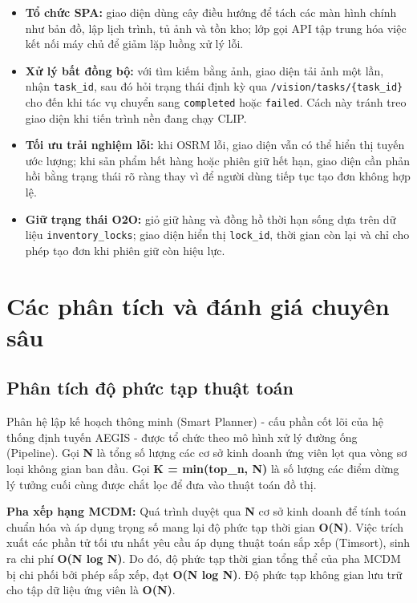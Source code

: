 \documentclass[12pt, a4paper]{article}
\begin{document}
\begin{itemize}
    \item \textbf{Tổ chức SPA:} giao diện dùng cây điều hướng để tách các màn hình chính như bản đồ, lập lịch trình, tủ ảnh và tồn kho; lớp gọi API tập trung hóa việc kết nối máy chủ để giảm lặp luồng xử lý lỗi.
    
    \item \textbf{Xử lý bất đồng bộ:} với tìm kiếm bằng ảnh, giao diện tải ảnh một lần, nhận \texttt{task\_id}, sau đó hỏi trạng thái định kỳ qua \texttt{/vision/tasks/\{task\_id\}} cho đến khi tác vụ chuyển sang \texttt{completed} hoặc \texttt{failed}. Cách này tránh treo giao diện khi tiến trình nền đang chạy CLIP.
    
    \item \textbf{Tối ưu trải nghiệm lỗi:} khi OSRM lỗi, giao diện vẫn có thể hiển thị tuyến ước lượng; khi sản phẩm hết hàng hoặc phiên giữ hết hạn, giao diện cần phản hồi bằng trạng thái rõ ràng thay vì để người dùng tiếp tục tạo đơn không hợp lệ.

    \item \textbf{Giữ trạng thái O2O:} giỏ giữ hàng và đồng hồ thời hạn sống dựa trên dữ liệu \texttt{inventory\_locks}; giao diện hiển thị \texttt{lock\_id}, thời gian còn lại và chỉ cho phép tạo đơn khi phiên giữ còn hiệu lực.
\end{itemize}

\clearpage
\section{Các phân tích và đánh giá chuyên sâu}

\subsection{Phân tích độ phức tạp thuật toán}
Phân hệ lập kế hoạch thông minh (Smart Planner) - cấu phần cốt lõi của hệ thống định tuyến AEGIS - được tổ chức theo mô hình xử lý đường ống (Pipeline). Gọi \textbf{N} là tổng số lượng các cơ sở kinh doanh ứng viên lọt qua vòng sơ loại không gian ban đầu. Gọi \textbf{K = min(top\_n, N)} là số lượng các điểm dừng lý tưởng cuối cùng được chắt lọc để đưa vào thuật toán đồ thị.

\textbf{Pha xếp hạng MCDM:} 
Quá trình duyệt qua \textbf{N} cơ sở kinh doanh để tính toán chuẩn hóa và áp dụng trọng số mang lại độ phức tạp thời gian \textbf{O(N)}. Việc trích xuất các phần tử tối ưu nhất yêu cầu áp dụng thuật toán sắp xếp (Timsort), sinh ra chi phí \textbf{O(N log N)}. Do đó, độ phức tạp thời gian tổng thể của pha MCDM bị chi phối bởi phép sắp xếp, đạt \textbf{O(N log N)}. Độ phức tạp không gian lưu trữ cho tập dữ liệu ứng viên là \textbf{O(N)}.
\end{document}
